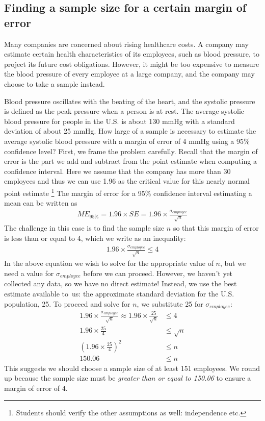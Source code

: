 \subsection{Finding a sample size for a certain margin of error}
\label{findingASampleSizeForACertainME}


Many companies are concerned about rising healthcare costs. A company may estimate certain health characteristics of its employees, such as blood pressure, to project its future cost obligations. However, it might be too expensive to measure the blood pressure of every employee at a large company, and the company may choose to take a sample instead.

\begin{example}{Blood pressure oscillates with the beating of the heart, and the systolic pressure is defined as the peak pressure when a person is at rest. The average systolic blood pressure for people in the U.S. is about 130 mmHg with a standard deviation of about 25 mmHg. How large of a sample is necessary to estimate the average systolic blood pressure with a margin of error of 4 mmHg using a 95\% confidence level?}
\label{sampleSizeComputationForSystolicBloodPressure}
First, we frame the problem carefully. Recall that the margin of error is the part we add and subtract from the point estimate when computing a confidence interval. Here we assume that the company has more than 30 employees and thus we can use 1.96 as the critical value for this nearly normal point estimate \footnote{Students should verify the other assumptions as well: independence etc.} The margin of error for a 95\% confidence interval estimating a mean can be written as
\begin{align*}
ME_{95\%} = 1.96\times SE = 1.96\times\frac{\sigma_{employee}}{\sqrt{n}}
\end{align*}
The challenge in this case is to find the sample size $n$ so that this margin of error is less than or equal to 4, which we write as an inequality:
\begin{align*}
1.96\times \frac{\sigma_{employee}}{\sqrt{n}} \leq 4
\end{align*}
In the above equation we wish to solve for the appropriate value of $n$, but we need a value for $\sigma_{employee}$ before we can proceed. However, we haven't yet collected any data, so we have no direct estimate! Instead, we use the best estimate available to~us: the approximate standard deviation for the U.S. population, 25. To proceed and solve for $n$, we substitute 25 for $\sigma_{employee}$:
\begin{align*}
1.96\times \frac{\sigma_{employee}}{\sqrt{n}} \approx 1.96\times\frac{25}{\sqrt{n}}
	&\leq 4 \\
1.96\times\frac{25}{4} &\leq \sqrt{n} \\
\left(1.96\times\frac{25}{4}\right)^2 &\leq n \\
150.06 &\leq n
\end{align*}
This suggests we should choose a sample size of at least 151 employees. We round up because the sample size must be \emph{greater than or equal to 150.06} to ensure a margin of error of 4.
\end{example}

